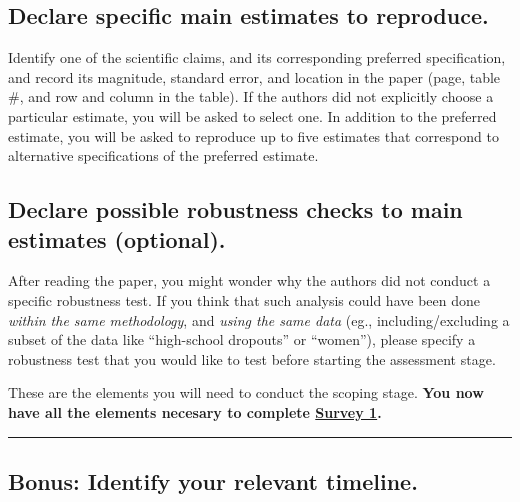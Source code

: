 \documentclass[]{book}
\begin{document}
\hypertarget{declare-specific-main-estimates-to-reproduce.}{%
\subsection*{Declare specific main estimates to reproduce.}\label{declare-specific-main-estimates-to-reproduce.}}

Identify one of the scientific claims, and its corresponding preferred specification, and record its magnitude, standard error, and location in the paper (page, table \#, and row and column in the table). If the authors did not explicitly choose a particular estimate, you will be asked to select one. In addition to the preferred estimate, you will be asked to reproduce up to five estimates that correspond to alternative specifications of the preferred estimate.

\hypertarget{declare-possible-robustness-checks-to-main-estimates-optional.}{%
\subsection*{Declare possible robustness checks to main estimates (optional).}\label{declare-possible-robustness-checks-to-main-estimates-optional.}}

After reading the paper, you might wonder why the authors did not conduct a specific robustness test. If you think that such analysis could have been done \emph{within the same methodology}, and \emph{using the same data} (eg., including/excluding a subset of the data like ``high-school dropouts'' or ``women''), please specify a robustness test that you would like to test before starting the assessment stage.

These are the elements you will need to conduct the scoping stage. \textbf{You now have all the elements necesary to complete \href{https://berkeley.qualtrics.com/jfe/form/SV_2bO83uJvU9ZiTXv}{Survey 1}.}

\begin{center}\rule{0.5\linewidth}{0.5pt}\end{center}

\hypertarget{bonus-identify-your-relevant-timeline.}{%
\subsection*{Bonus: Identify your relevant timeline.}\label{bonus-identify-your-relevant-timeline.}}
\end{document}
